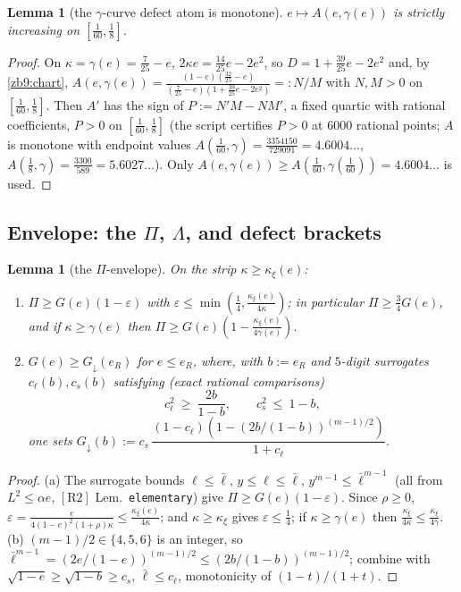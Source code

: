 \documentclass[11pt]{amsart}
\newtheorem{lemma}[theorem]{Lemma}
\newcommand{\eps}{\varepsilon}
\newcommand{\kxi}{\kappa_\xi}
\newcommand{\lbar}{\bar\ell}
\newcommand{\RII}{[\textrm{R2}]}
\begin{document}
\begin{lemma}[the $\gamma$-curve defect atom is monotone]\label{zb9:Agamma}
$e\mapsto A(e,\gamma(e))$ is strictly increasing on $[\tfrac1{60},\tfrac18]$.
\end{lemma}

\begin{proof}
On $\kappa=\gamma(e)=\tfrac7{25}-e$, $2\kappa e=\tfrac{14}{25}e-2e^2$, so
$D=1+\tfrac{39}{25}e-2e^2$ and, by \eqref{zb9:chart},
$A(e,\gamma(e))=\tfrac{(1-e)(\frac{32}{25}-e)}{(\frac7{25}-e)(1+\frac{39}{25}e-2e^2)}=:N/M$
with $N,M>0$ on $[\tfrac1{60},\tfrac18]$.  Then $A'$ has the sign of
$P:=N'M-NM'$, a fixed quartic with rational coefficients, $P>0$ on
$[\tfrac1{60},\tfrac18]$ (the script certifies $P>0$ at $6000$ rational points;
$A$ is monotone with endpoint values
$A(\tfrac1{60},\gamma)=\tfrac{3354150}{729091}=4.6004\ldots$,
$A(\tfrac18,\gamma)=\tfrac{3300}{589}=5.6027\ldots$).  Only
$A(e,\gamma(e))\ge A(\tfrac1{60},\gamma(\tfrac1{60}))=4.6004\ldots$ is used.
\end{proof}

\subsection*{Envelope: the $\Pi$, $\Lambda$, and defect brackets}

\begin{lemma}[the $\Pi$-envelope]\label{zb9:env}
On the strip $\kappa\ge\kxi(e)$:
\begin{enumerate}[label=\textup{(\alph*)},itemsep=1pt]
\item $\Pi\ge G(e)(1-\eps)$ with $\eps\le\min(\tfrac14,\tfrac{\kxi(e)}{4\kappa})$;
in particular $\Pi\ge\tfrac34G(e)$, and if $\kappa\ge\gamma(e)$ then
$\Pi\ge G(e)(1-\tfrac{\kxi(e)}{4\gamma(e)})$.
\item $G(e)\ge G_\downarrow(e_R)$ for $e\le e_R$, where, with $b:=e_R$ and
$5$-digit surrogates $c_\ell(b),c_s(b)$ satisfying (exact rational comparisons)
\begin{equation}\label{zb9:surr}
 c_\ell^2\ \ge\ \frac{2b}{1-b},\qquad c_s^2\ \le\ 1-b,
\end{equation}
one sets $G_\downarrow(b):=c_s\,\dfrac{(1-c_\ell)(1-(2b/(1-b))^{(m-1)/2})}{1+c_\ell}$.
\end{enumerate}
\end{lemma}

\begin{proof}
(a) The surrogate bounds $\ell\le\lbar$, $y\le\ell\le\lbar$,
$y^{m-1}\le\lbar^{m-1}$ (all from $L^2\le\alpha e$, $\RII$
Lem.~\texttt{elementary}) give $\Pi\ge G(e)(1-\eps)$.  Since $\rho\ge0$,
$\eps=\tfrac{e}{4(1-e)^2(1+\rho)\kappa}\le\tfrac{\kxi(e)}{4\kappa}$; and
$\kappa\ge\kxi$ gives $\eps\le\tfrac14$; if $\kappa\ge\gamma(e)$ then
$\tfrac{\kxi}{4\kappa}\le\tfrac{\kxi}{4\gamma}$.
(b) $(m-1)/2\in\{4,5,6\}$ is an integer, so
$\lbar^{m-1}=(2e/(1-e))^{(m-1)/2}\le(2b/(1-b))^{(m-1)/2}$; combine with
$\sqrt{1-e}\ge\sqrt{1-b}\ge c_s$, $\lbar\le c_\ell$, monotonicity of
$(1-t)/(1+t)$.
\end{proof}
\end{document}
